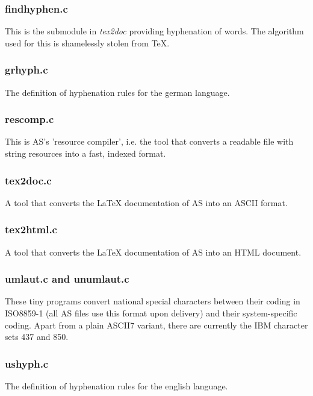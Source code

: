 \documentclass[12pt,twoside]{report}
\begin{document}
\subsubsection{findhyphen.c}

This is the submodule in {\em tex2doc} providing hyphenation of words.
The algorithm used for this is shamelessly stolen from TeX.

\subsubsection{grhyph.c}

The definition of hyphenation rules for the german language.

\subsubsection{rescomp.c}

This is AS's 'resource compiler', i.e. the tool that converts a readable
file with string resources into a fast, indexed format.

\subsubsection{tex2doc.c}

A tool that converts the LaTeX documentation of AS into an ASCII format.

\subsubsection{tex2html.c}

A tool that converts the LaTeX documentation of AS into an HTML document.

\subsubsection{umlaut.c and unumlaut.c}

These tiny programs convert national special characters between their
coding in ISO8859-1 (all AS files use this format upon delivery) and their
system-specific coding.  Apart from a plain ASCII7 variant, there are
currently the IBM character sets 437 and 850.

\subsubsection{ushyph.c}

The definition of hyphenation rules for the english language.
\end{document}
